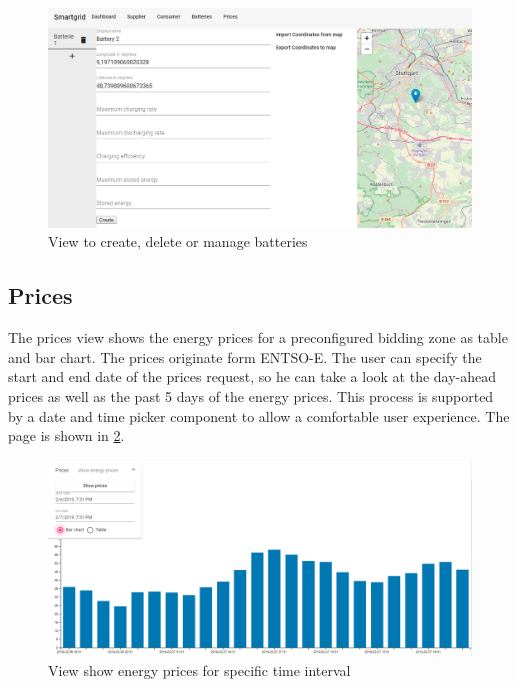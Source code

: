 \begin{figure}[!h]
    \centering
    \includegraphics[width=1.00\textwidth]{../figures/batteriesView.PNG}
    \caption{View to create, delete or manage batteries}
    \label{fig:batteries}
\end{figure}


\subsection{Prices}
The prices view shows the energy prices for a preconfigured bidding zone as table and bar chart. The prices originate form ENTSO-E.
The user can specify the start and end date of the prices request, so he can take a look at the day-ahead prices as well as the past 5 days of the energy prices. This process is supported by a date and time picker component to allow a comfortable user experience. 
The page is shown in \cref{fig:prices}. 

\begin{figure}[!h]
    \centering
\includegraphics[width=1.00\textwidth]{../figures/prices.PNG}
    \caption{View show energy prices for specific time interval}
    \label{fig:prices}
\end{figure}

